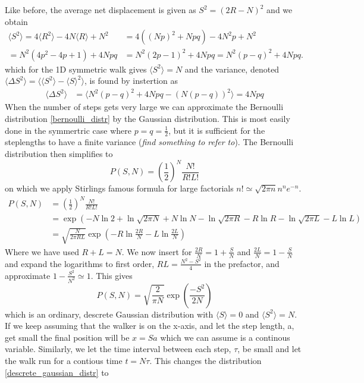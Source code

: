 Like before, the average net displacement is given as $S^2 = (2R-N)^2$ and we obtain
\begin{align*}
 \langle S^2\rangle = 4\langle R^2\rangle -4N\langle R\rangle + N^2 &= 4((Np)^2 +Npq) -4N^2p + N^2\\
 = N^2(4p^2 -4p +1) +4Npq &= N^2(2p-1)^2 +4Npq = N^2(p-q)^2 +4Npq.
\end{align*}
which for the 1D symmetric walk gives $\langle S^2\rangle =N$ and the variance, denoted $\langle\Delta S^2\rangle = \langle\langle S^2\rangle-\langle S\rangle^2\rangle$, is found by instertion as
\begin{align}
 \langle\Delta S^2\rangle &= \langle N^2(p-q)^2 +4Npq - ( N(p-q))^2\rangle= 4Npq 
\end{align}
When the number of steps gets very large we can approximate the Bernoulli distribution \ref{bernoulli_distr} by the Gaussian distribution. 
This is most easily done in the symmertric case where $p=q=\frac{1}{2}$, but it is sufficient for the steplengths to have a finite variance (\emph{find something to refer to}). 
The Bernoulli distribution then simplifies to
\begin{equation}
 P(S,N) = \left(\frac{1}{2}\right)^N\frac{N!}{R!L!}
\end{equation}
on which we apply Stirlings famous formula for large factorials $n!\simeq\sqrt{2\pi n}n^ne^{-n}$.
\begin{align*}
 P(S,N) &= \left(\frac{1}{2}\right)^N\frac{N!}{R!L!} \\
 &= \exp\left(-N\ln2+\ln\sqrt{2\pi N}+N\ln N - \ln\sqrt{2\pi R} -R\ln R - \ln\sqrt{2\pi L} - L\ln L \right) \\
 &= \sqrt{\frac{N}{2\pi RL}}\exp\left(-R\ln\frac{2R}{N}-L\ln\frac{2L}{N}\right)
\end{align*}
Where we have used $R+L=N$. We now insert for $\frac{2R}{N}=1+\frac{S}{N}$ and $\frac{2L}{N}=1-\frac{S}{N}$ and expand the logarithms to first order, $RL=\frac{N^2-S^2}{4}$ in the prefactor, and approximate $1-\frac{S^2}{N^2}\simeq1$. This gives
\begin{equation}\label{descrete_gaussian_distr}
 P(S,N) =\sqrt{\frac{2}{\pi N}}\exp\left(\frac{-S^2}{2N}\right)
\end{equation}
which is an ordinary, descrete Gaussian distribution with $\langle S\rangle = 0$  and $\langle S^2\rangle = N$. 
If we keep assuming that the walker is on the x-axis, and let the step length, a, get small the final position will be $x=Sa$ which we can assume is a continous variable. 
Similarly, we let the time interval between each step, $\tau$, be small and let the walk run for a contious time $t=N\tau$. This changes the distribution \ref{descrete_gaussian_distr} to
